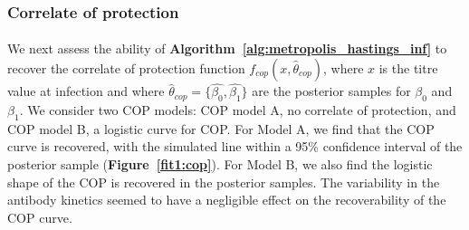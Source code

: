 \subsubsection{Correlate of protection}

\paragraph{}We next assess the ability of \textbf{Algorithm~\ref{alg:metropolis_hastings_inf}} to recover the correlate of protection function $f_{cop}(x, \hat{\theta}_{cop})$, where $x$ is the titre value at infection and where $\hat{\theta}_{cop} = \{\hat{\beta_0}, \hat{\beta_1}\}$ are the posterior samples for $\beta_0$ and $\beta_1$. We consider two COP models: COP model A, no correlate of protection, and COP model B, a logistic curve for COP. For Model A, we find that the COP curve is recovered, with the simulated line within a 95\% confidence interval of the posterior sample (\textbf{Figure~\ref{fit1:cop}}). For Model B, we also find the logistic shape of the COP is recovered in the posterior samples. The variability in the antibody kinetics seemed to have a negligible effect on the recoverability of the COP curve. 

